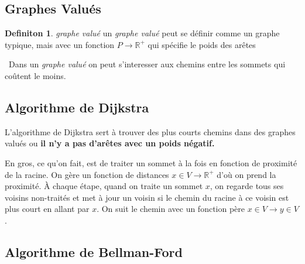 \documentclass[french]{article}
\theoremstyle{definition}
\newtheorem{definition}{Definiton}[subsection]
\begin{document}
		\subsection{Graphes Valués}
		\begin{definition}{\textit{graphe valué}}
			un \textit{graphe valué} peut se définir comme un graphe typique, mais avec un fonction $P \to \mathbb{R}^+$ qui spécifie le poids des arêtes
		\end{definition}
		\
		Dans un \textit{graphe valué} on peut s'interesser aux chemins entre les sommets qui coûtent le moins.

		\subsection{Algorithme de Dijkstra}

		L'algorithme de Dijkstra sert à trouver des plus courts chemins dans des graphes valués ou \textbf{il n'y a pas d'arêtes avec un poids négatif.}

		\begin{algorithmic}[1]
			\ENDFOR
			\WHILE{$\exists x \in V$ tel que $\text{traité}(x) = 0$}
						\STATE{$\text{père}(y) \leftarrow x$}
					\ENDIF
				\ENDFOR
			\ENDWHILE
		\end{algorithmic}

		En gros, ce qu'on fait, est de traiter un sommet à la fois en fonction de proximité de la racine. On gère un fonction de distances $x \in V \to \mathbb{R}^+$ d'où on prend la proximité. À chaque étape, quand on traite un sommet $x$, on regarde tous ses voisins non-traités et met à jour un voisin si le chemin du racine à ce voisin est plus court en allant par $x$. On suit le chemin avec un fonction père $x \in V \to y \in V$.

		\subsection{Algorithme de Bellman-Ford}
\end{document}
